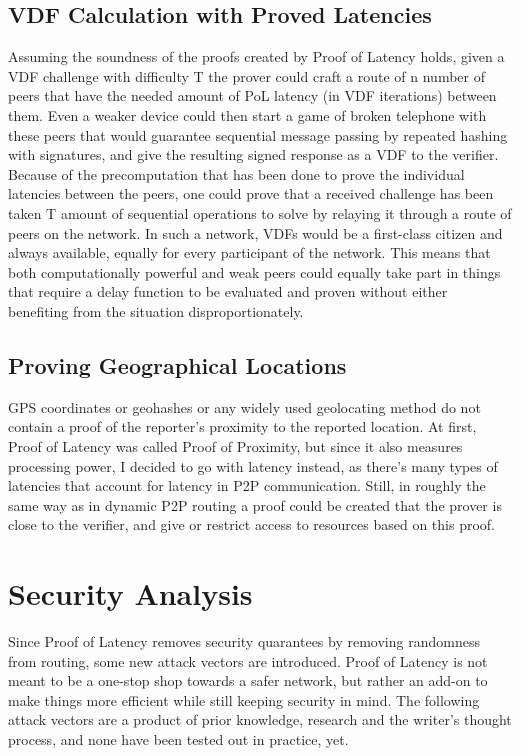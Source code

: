 \subsection{VDF Calculation with Proved Latencies}
Assuming the soundness of the proofs created by Proof of Latency holds, given a VDF challenge with difficulty T the prover could craft a route of n number of peers that have the needed amount of PoL latency (in VDF iterations) between them. Even a weaker device could then start a game of broken telephone with these peers that would guarantee sequential message passing by repeated hashing with signatures, and give the resulting signed response as a VDF to the verifier. Because of the precomputation that has been done to prove the individual latencies between the peers, one could prove that a received challenge has been taken T amount of sequential operations to solve by relaying it through a route of peers on the network. In such a network, VDFs would be a first-class citizen and always available, equally for every participant of the network. This means that both computationally powerful and weak peers could equally take part in things that require a delay function to be evaluated and proven without either benefiting from the situation disproportionately.

\subsection{Proving Geographical Locations}
GPS coordinates or geohashes or any widely used geolocating method do not contain a proof of the reporter's proximity to the reported location. At first, Proof of Latency was called Proof of Proximity, but since it also measures processing power, I decided to go with latency instead, as there's many types of latencies that account for latency in P2P communication. Still, in roughly the same way as in dynamic P2P routing a proof could be created that the prover is close to the verifier, and give or restrict access to resources based on this proof.

\section{Security Analysis}
Since Proof of Latency removes security quarantees by removing randomness from routing, some new attack vectors are introduced. Proof of Latency is not meant to be a one-stop shop towards a safer network, but rather an add-on to make things more efficient while still keeping security in mind. The following attack vectors are a product of prior knowledge, research and the writer's thought process, and none have been tested out in practice, yet.
